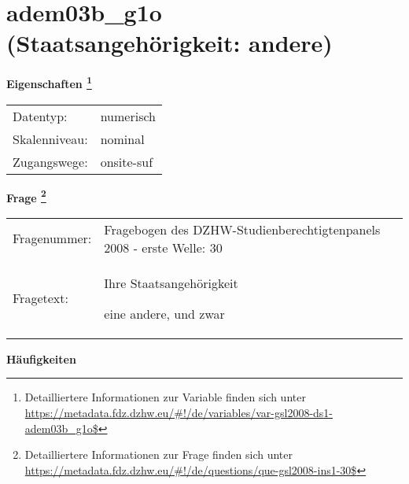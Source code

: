 
    \setcounter{footnote}{0}

    \vspace*{-1.8cm}
	\section{adem03b\_g1o (Staatsangehörigkeit: andere)}
	\label{section:adem03b_g1o}



    \vspace*{0.5cm}
    \noindent\textbf{Eigenschaften
	\footnote{Detailliertere Informationen zur Variable finden sich unter
		\url{https://metadata.fdz.dzhw.eu/\#!/de/variables/var-gsl2008-ds1-adem03b_g1o$}}}\\
	\begin{tabularx}{\hsize}{@{}lX}
	Datentyp: & numerisch \\
	Skalenniveau: & nominal \\
	Zugangswege: &
	  onsite-suf
 \\
    \end{tabularx}



				\vspace*{0.5cm}
                \noindent\textbf{Frage
	                \footnote{Detailliertere Informationen zur Frage finden sich unter
		              \url{https://metadata.fdz.dzhw.eu/\#!/de/questions/que-gsl2008-ins1-30$}}}\\
				\begin{tabularx}{\hsize}{@{}lX}
					Fragenummer: &
					  Fragebogen des DZHW-Studienberechtigtenpanels 2008 - erste Welle:
					  30
 \\
					Fragetext: & Ihre Staatsangehörigkeit\par  eine andere, und zwar \\
				\end{tabularx}





        		\vspace*{0.5cm}
                \noindent\textbf{Häufigkeiten}

